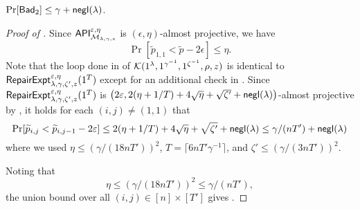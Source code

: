 \begin{lemma}\label{lem:bad_2}
$\Pr[\mathsf{Bad}_2]\le \gamma+\mathsf{negl}(\lambda)$. 
\end{lemma}
\begin{proof}[Proof of ]
Since $\mathsf{API}_{\mathcal{M}_{\lambda,\gamma,z}}^{\varepsilon,\eta}$ is $(\epsilon,\eta)$-almost projective, we have 
$$\Pr[\tilde{p}_{1,1}<\tilde{p}-2\epsilon]\le \eta.$$ 
Note that the loop done in  of $\mathcal{K}(1^\lambda,1^{\gamma^{-1}},1^{\zeta^{-1}},\rho,z)$ is identical to $\mathsf{RepairExpt}_{\lambda,\gamma,\zeta',z}^{\varepsilon,\eta}(1^T)$ except for an additional check in .  
Since $\mathsf{RepairExpt}_{\lambda,\gamma,\zeta',z}^{\varepsilon,\eta}(1^T)$ 
is $\big(2\varepsilon,2(\eta+1/T)+4\sqrt{\eta}+\sqrt{\zeta'}+\mathsf{negl}(\lambda)\big)$-almost projective by , it holds for each 
$(i,j)\ne (1,1)$ that
$$\Pr[\widetilde{p}_{i,j}<\widetilde{p}_{i,j-1}-2\varepsilon]\le 2(\eta+1/T)+4\sqrt{\eta}+\sqrt{\zeta'}+\mathsf{negl}(\lambda)\le \gamma/(nT')+\mathsf{negl}(\lambda)$$
where we used $\eta\le \left( \gamma/(18nT')\right)^2$, $T=\lceil 6nT'\gamma^{-1} \rceil$, and $\zeta'\le \left( \gamma/(3nT')\right)^2$.

Noting that 
$$\eta\le \left( \gamma/(18nT')\right)^2\le \gamma/(nT'),$$ 
the union bound over all $(i,j)\in [n]\times [T']$
gives .

\end{proof}

